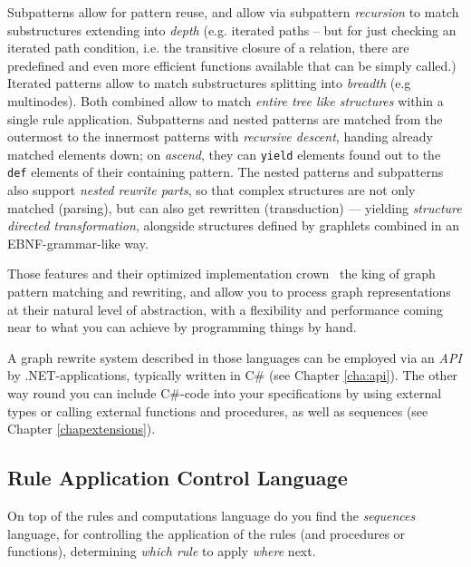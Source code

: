 Subpatterns allow for pattern reuse, and allow via subpattern \emph{recursion} to match substructures extending into \emph{depth} (e.g. iterated paths -- but for just checking an iterated path condition, i.e. the transitive closure of a relation, there are predefined and even more efficient functions available that can be simply called.)
Iterated patterns allow to match substructures splitting into \emph{breadth} (e.g multinodes).
Both combined allow to match \emph{entire tree like structures} within a single rule application. 
Subpatterns and nested patterns are matched from the outermost to the innermost patterns with \emph{recursive descent}, handing already matched elements down; on \emph{ascend}, they can \texttt{yield} elements found out to the \texttt{def} elements of their containing pattern.
The nested patterns and subpatterns also support \emph{nested rewrite parts}, so that complex structures are not only matched (parsing), but can also get rewritten (transduction) --- yielding \emph{structure directed transformation}, alongside structures defined by graphlets combined in an EBNF-grammar-like way\cite{EBNFAGTIVE}.

Those features and their optimized implementation crown \GrG\ the king of graph pattern matching and rewriting, and allow you to process graph representations at their natural level of abstraction, with a flexibility and performance coming near to what you can achieve by programming things by hand.

A graph rewrite system described in those languages can be employed via an \emph{API} by .NET-applications, typically written in C\# (see Chapter \ref{cha:api}).
The other way round you can include C\#-code into your specifications by using external types or calling external functions and procedures, as well as sequences (see Chapter \ref{chapextensions}).

\subsection{Rule Application Control Language}
On top of the rules and computations language do you find the \emph{sequences} language, for controlling the application of the rules (and procedures or functions), determining \emph{which rule} to apply \emph{where} next. 

